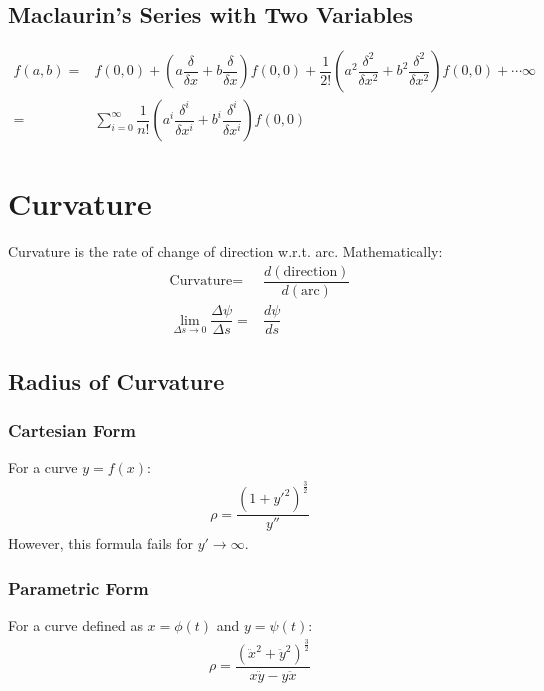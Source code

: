 \documentclass[../main.tex]{subfile}
\begin{document}
    \subsection{Maclaurin's Series with Two Variables}
    \begin{align}
    f(a,b) = & f(0,0) + \left( a \dfrac{\delta}{\delta x} + b \dfrac{\delta}{\delta x} \right) f(0,0) + \dfrac{1}{2!} \left( a^2 \dfrac{\delta^2}{\delta x^2} + b^2 \dfrac{\delta^2}{\delta x^2} \right) f(0,0) + \cdots\infty&\\
           = & \sum_{i=0}^\infty \dfrac{1}{n!} \left( a^i \dfrac{\delta^i}{\delta x^i} + b^i \dfrac{\delta^i}{\delta x^i} \right) f(0,0)
    \end{align}

    \section{Curvature}
    Curvature is the rate of change of direction w.r.t. arc. Mathematically:
    \begin{align}
        \text{Curvature} = & \dfrac{d(\text{direction})}{d(\text{arc})}\\
        \lim_{\Delta s \to 0} \dfrac{\Delta \psi}{\Delta s} = & \dfrac{d\psi}{ds}
    \end{align}

    \subsection{Radius of Curvature}
    \subsubsection{Cartesian Form}
    For a curve $y=f(x)$:
    \begin{align}
        \rho=\dfrac{(1+y'^2)^{\frac{3}{2}}}{y''}
    \end{align}
    However, this formula fails for $y'\to\infty$.
    \subsubsection{Parametric Form}
    For a curve defined as $x=\phi(t)$ and $y=\psi(t)$:
    \begin{align}
        \rho=\dfrac{(\ddot{x}^2+\ddot{y}^2)^{\frac{3}{2}}}{x\ddot{y}-y\ddot{x}}
    \end{align}
\end{document}
